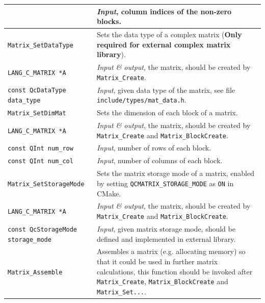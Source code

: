 \documentclass[a4paper,11pt,twoside,openright]{book}
\begin{document}
\begin{center}
\begin{longtable}{l|p{}}
      & \textsl{Input}, column indices of the non-zero blocks.\\
    \hline
%
    \verb|Matrix_SetDataType|\index{\texttt{Matrix\_SetDataType}} %
      & Sets the data type of a complex matrix %
        (\textbf{Only required for external complex matrix library}).\\
    \hspace*{2ex}\verb|LANG_C_MATRIX *A| %
      & \textsl{Input \& output}, the matrix, should be created by \verb|Matrix_Create|.\\
    \hspace*{2ex}\verb|const QcDataType data_type| %
      & \textsl{Input}, given data type of the matrix, see file
        \verb|include/types/mat_data.h|.\\
    \hline
%
    \verb|Matrix_SetDimMat|\index{\texttt{Matrix\_SetDimMat}} %
      & Sets the dimension of each block of a matrix.\\
    \hspace*{2ex}\verb|LANG_C_MATRIX *A| %
      & \textsl{Input \& output}, the matrix, should be created by \verb|Matrix_Create|
        and \verb|Matrix_BlockCreate|.\\
    \hspace*{2ex}\verb|const QInt num_row| %
      & \textsl{Input}, number of rows of each block.\\
    \hspace*{2ex}\verb|const QInt num_col| %
      & \textsl{Input}, number of columns of each block.\\
    \hline
%
    \verb|Matrix_SetStorageMode|\index{\texttt{Matrix\_SetStorageMode}} %
      & Sets the matrix storage mode of a matrix, enabled by setting
        \verb|QCMATRIX_STORAGE_MODE| as \verb|ON| in CMake.\\
    \hspace*{2ex}\verb|LANG_C_MATRIX *A| %
      & \textsl{Input \& output}, the matrix, should be created by \verb|Matrix_Create|
        and \verb|Matrix_BlockCreate|.\\
    \hspace*{2ex}\verb|const QcStorageMode storage_mode| %
      & \textsl{Input}, given matrix storage mode, should be defined and
        implemented in external library.\\
    \hline
%
    \verb|Matrix_Assemble|\index{\texttt{Matrix\_Assemble}} %
      & Assembles a matrix (e.g. allocating memory) so that it could be used
        in further matrix calculations, this function should be invoked after
        \verb|Matrix_Create|, \verb|Matrix_BlockCreate| and \verb|Matrix_Set...|.\\

\end{longtable}
\end{center}
\end{document}
